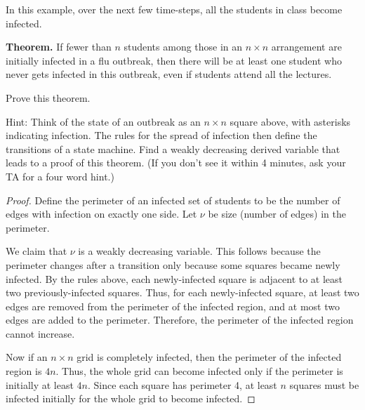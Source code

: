 \documentclass[14pt]{extarticle}
\begin{document}
In this example, over the next few time-steps, all the students in class become infected.

{\bf Theorem.} If fewer than $n$ students among those in an $n \times n$ arrangement are initially infected in a flu outbreak, then there will be at least one student who never gets infected in this outbreak, even if students attend all the lectures.

Prove this theorem.

Hint: Think of the state of an outbreak as an $n \times n$ square above, with asterisks indicating infection. The rules for the spread of infection then define the transitions of a state machine. Find a weakly decreasing derived variable that leads to a proof of this theorem. (If you don’t see it within 4 minutes, ask your TA for a four word hint.)

\begin{proof}
Define the perimeter of an infected set of students to be the number of edges with infection on exactly one side. Let $\nu$ be size (number of edges) in the perimeter.

We claim that $\nu$ is a weakly decreasing variable. This follows because the perimeter changes after a transition only because some squares became newly infected. By the rules above, each newly-infected square is adjacent to at least two previously-infected squares. Thus, for each newly-infected square, at least two edges are removed from the perimeter of the infected region, and at most two edges are added to the perimeter. Therefore, the perimeter of the infected region cannot increase.

Now if an $n\times n$ grid is completely infected, then the perimeter of the infected region is $4n$. Thus, the whole grid can become infected only if the perimeter is initially at least $4n$. Since each square has perimeter 4, at least $n$ squares must be infected initially for the whole grid to become infected.
\end{proof}
\end{document}
